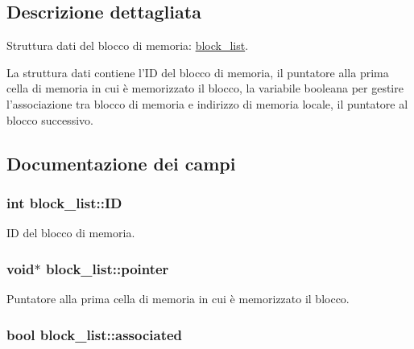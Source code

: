 \subsection{Descrizione dettagliata}
Struttura dati del blocco di memoria: \hyperlink{structblock__list}{block\_\-list}. 

La struttura dati contiene l'ID del blocco di memoria, il puntatore alla prima cella di memoria in cui è memorizzato il blocco, la variabile booleana per gestire l'associazione tra blocco di memoria e indirizzo di memoria locale, il puntatore al blocco successivo. 

\subsection{Documentazione dei campi}
\hypertarget{structblock__list_ffcd96e737413a77caf6eb83ca18d5c1_ffcd96e737413a77caf6eb83ca18d5c1}{
\subsubsection[{ID}]{\setlength{\rightskip}{0pt plus 5cm}int {\bf block\_\-list::ID}}}
\label{structblock__list_ffcd96e737413a77caf6eb83ca18d5c1_ffcd96e737413a77caf6eb83ca18d5c1}


ID del blocco di memoria. 

\hypertarget{structblock__list_00f54f470b2a579aab495ee7f414ed97_00f54f470b2a579aab495ee7f414ed97}{
\subsubsection[{pointer}]{\setlength{\rightskip}{0pt plus 5cm}void$\ast$ {\bf block\_\-list::pointer}}}
\label{structblock__list_00f54f470b2a579aab495ee7f414ed97_00f54f470b2a579aab495ee7f414ed97}


Puntatore alla prima cella di memoria in cui è memorizzato il blocco. 

\hypertarget{structblock__list_1cd72fdc1de5c3d7e8b8f8da29a3dbfd_1cd72fdc1de5c3d7e8b8f8da29a3dbfd}{
\subsubsection[{associated}]{\setlength{\rightskip}{0pt plus 5cm}bool {\bf block\_\-list::associated}}}
\label{structblock__list_1cd72fdc1de5c3d7e8b8f8da29a3dbfd_1cd72fdc1de5c3d7e8b8f8da29a3dbfd}


